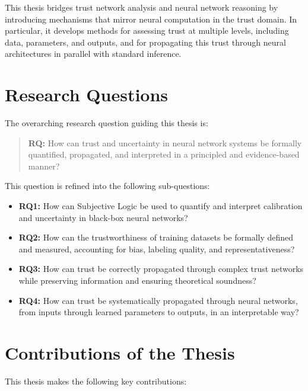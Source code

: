 This thesis bridges trust network analysis and neural network reasoning by introducing mechanisms that mirror neural computation in the trust domain. In particular, it develops methods for assessing trust at multiple levels, including data, parameters, and outputs, and for propagating this trust through neural architectures in parallel with standard inference.

\section{Research Questions}
\label{sec:research_questions}

The overarching research question guiding this thesis is:

\begin{quote}
\textbf{RQ:} How can trust and uncertainty in neural network systems be formally quantified, propagated, and interpreted in a principled and evidence-based manner?
\end{quote}

This question is refined into the following sub-questions:

\begin{itemize}
    \item \textbf{RQ1:} How can Subjective Logic be used to quantify and interpret calibration and uncertainty in black-box neural networks?
    \item \textbf{RQ2:} How can the trustworthiness of training datasets be formally defined and measured, accounting for bias, labeling quality, and representativeness?
    \item \textbf{RQ3:} How can trust be correctly propagated through complex trust networks while preserving information and ensuring theoretical soundness?
    \item \textbf{RQ4:} How can trust be systematically propagated through neural networks, from inputs through learned parameters to outputs, in an interpretable way?
\end{itemize}

\section{Contributions of the Thesis}
\label{sec:contributions}

This thesis makes the following key contributions:

